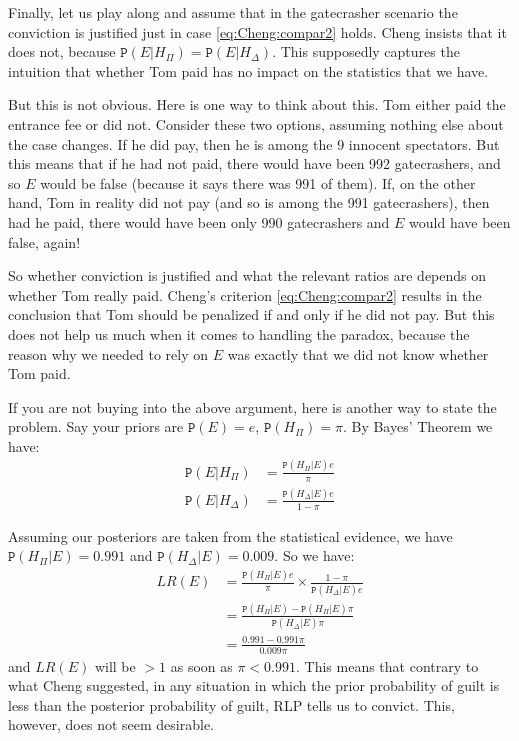 \documentclass{ifcolog}
\newcommand{\pr}[1]{\mbox{$\mathtt{P}(#1)$}}
\begin{document}
 Finally, let us play along and assume that in the gatecrasher scenario the conviction is justified just in case \eqref{eq:Cheng:compar2} holds.  Cheng insists that it does not, because $\pr{E\vert H_\Pi}=\pr{E\vert H_\Delta}$. This supposedly captures the intuition that whether Tom paid has no impact on the statistics that we have. 

 But this is not obvious. Here is one way to think about this. Tom either paid the entrance fee or did not. Consider these two options, assuming nothing else about the case changes. If he did pay, then he is among the 9 innocent spectators. But this means that if he had not paid, there would have been 992 gatecrashers, and so $E$ would be false (because it says there was 991 of them). If, on the other hand, Tom in reality did not pay (and so is among the 991 gatecrashers), then had he paid, there  would have been only 990 gatecrashers and $E$ would have been false, again!



 So whether conviction is justified and what the relevant ratios are depends on whether Tom really paid. Cheng's criterion \eqref{eq:Cheng:compar2} results in the conclusion that Tom should be penalized if and only if he did not pay. But this does not help us much when it comes to handling the paradox, because the reason why we needed to rely on $E$ was exactly that we did not know whether Tom paid. 



 If you are not buying into the above argument,  here is another way to state the problem. Say your priors are $\pr{E}=e$, $\pr{H_\Pi}=\pi$. By Bayes' Theorem we have:
 \begin{align*}
 \pr{E\vert H_\Pi} & = \frac{\pr{H_\Pi\vert E}e}{\pi}\\
 \pr{E\vert H_\Delta} & = \frac{\pr{H_\Delta\vert E}e}{1-\pi}
 \end{align*}

 \noindent Assuming our posteriors are taken from the statistical evidence, we have $\pr{H_\Pi\vert E}=0.991$ and $\pr{H_\Delta\vert E }=0.009$. So we have:
 \begin{align}
 \label{eq:Cheng_lre} LR(E) & = \frac{\pr{H_\Pi\vert E}e}{\pi}\times \frac{1-\pi}{\pr{H_\Delta\vert E}e}\\ \nonumber
 & = \frac{\pr{H_\Pi \vert E} - \pr{H_\Pi\vert E}\pi}{\pr{H_\Delta\vert E}\pi}\\ \nonumber
 & = \frac{0.991-0.991\pi}{0.009\pi}
 \end{align}
 \noindent and $LR(E)$ will be $>1$ as soon as $\pi<0.991$. This means that contrary to what Cheng suggested, in any situation in which the prior probability of guilt is less than the posterior probability of guilt, RLP tells us to convict. This, however, does not seem desirable. 
\end{document}
